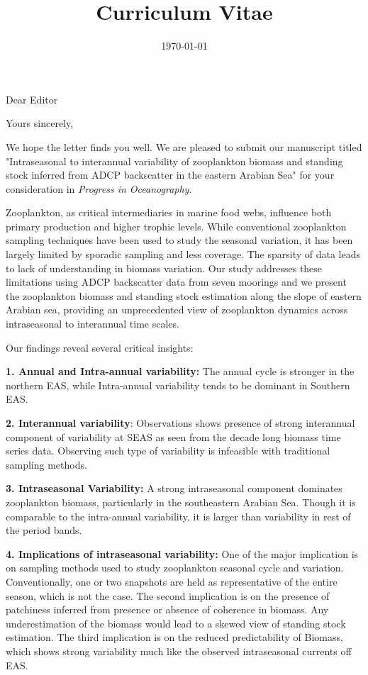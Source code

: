 \documentclass[11pt,a4paper,roman]{moderncv}        %
\title{Curriculum Vitae}                          %
\begin{document}
	
	\date{\today}
	\opening{Dear Editor}
	\closing{Yours sincerely,}

	\justifying
	\makelettertitle
	\setlength{\parindent}{4em}We hope the letter finds you well. We are pleased to submit our manuscript titled "Intraseasonal to interannual variability of zooplankton biomass and standing stock inferred from ADCP backscatter in the eastern Arabian Sea" for your consideration in \textit{Progress in Oceanography}.
	
	\setlength{\parindent}{4em}Zooplankton, as critical intermediaries in marine food webs, influence both primary production and higher trophic levels. While conventional zooplankton sampling techniques have been used to study the seasonal variation, it has been largely limited by sporadic sampling and less coverage. The sparsity of data leads to lack of understanding in biomass variation. Our study addresses these limitations using ADCP backscatter data from seven moorings and we present the zooplankton biomass and standing stock estimation  along the slope of eastern Arabian sea, providing an unprecedented view of zooplankton dynamics across intraseasonal to interannual time scales. 
	
	Our findings reveal several critical insights:
	
	\textbf{1. Annual and Intra-annual variability:} The annual cycle is stronger in the northern EAS, while Intra-annual variability tends to be dominant in Southern EAS.
	
	\textbf{2. Interannual variability}: Observations shows presence of strong interannual component of variability at SEAS as seen from the decade long biomass time series data. Observing such type of variability is infeasible with traditional sampling methods.
	
	\textbf{3. Intraseasonal Variability:} A strong intraseasonal component dominates zooplankton biomass, particularly in the southeastern Arabian Sea. Though it is comparable to the intra-annual variability, it is larger than variability in rest of the period bands.
	
	\textbf{4. Implications of intraseasonal variability:} One of the major implication is on sampling methods used to study zooplankton seasonal cycle and variation. Conventionally, one or two snapshots are held as representative of the entire season, which is not the case. The second implication is on the presence of patchiness inferred from presence or absence of coherence in biomass. Any underestimation of the biomass would lead to a skewed view of standing stock estimation. The third implication is on the reduced predictability of Biomass, which shows strong variability much like the observed intraseasonal currents off EAS. 
	
\end{document}
